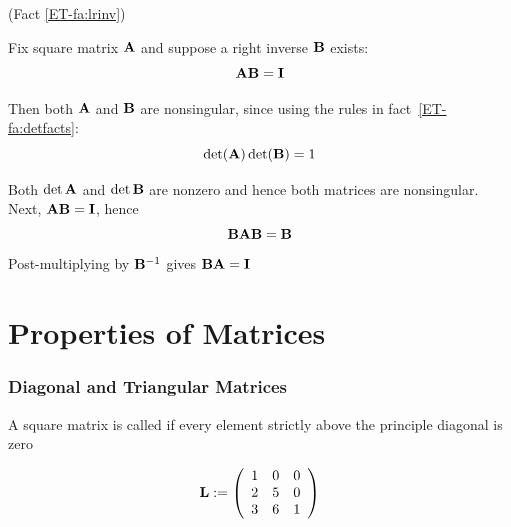 \begin{frame}

    \vspace{2em}
    \Prf (Fact \ref{ET-fa:lrinv})
    
    Fix square matrix $\mathbf A$ and suppose a right
    inverse $\mathbf B$ exists: \[\mathbf A \mathbf B = \mathbf I\]
    
    Then both $\mathbf A$ and $\mathbf B$ are nonsingular,  since using the rules
    in fact~\ref{ET-fa:detfacts}: \[\det(\mathbf A) \det(\mathbf B) = 1\]
    
    Both $\det \mathbf A$ and $\det \mathbf B$ are nonzero and hence both
    matrices are nonsingular. Next, $\mathbf A \mathbf B = \mathbf I$, hence 
    \[\mathbf B \mathbf A \mathbf B = \mathbf B\]
    Post-multiplying by $\mathbf B^{-1}$ gives $\mathbf B \mathbf A = \mathbf I$
    
\end{frame}

\section{Properties of Matrices}

\begin{frame}\frametitle{Diagonal and Triangular Matrices}
    
    \vspace{2em}
    A square matrix is called  if every element strictly above the
    principle diagonal is zero
    
    \vspace{.7em}
    \Eg
    \begin{equation*}
        \label{eq:ltute}
        \mathbf L :=
        \left(
        \begin{array}{ccc}
            1 & 0 & 0  \\
            2 & 5 & 0 \\
            3 & 6 & 1
        \end{array}
        \right)
    \end{equation*}
    
\end{frame}

